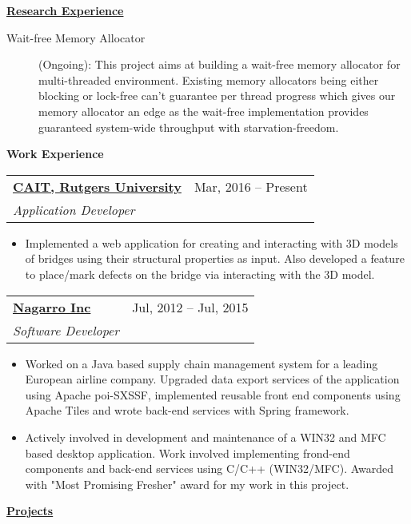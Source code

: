 \documentclass[letterpaper,11pt]{article}
\makeatletter
\newcommand{\resitem}[1]{\item #1 \vspace{2pt}}
\newcommand{\resheading}[1]{{\large \colorbox{mygrey}{\begin{minipage}{\textwidth}{\textbf{#1 \vphantom{p\^{E}}}}\end{minipage}}}\vspace{6pt}}
\newcommand{\ressubheading}[4]{
\begin{tabular*}{7in}{l@{\extracolsep{\fill}}r}
		\textbf{#1} & #2 \\
		\textit{#3} & \textit{#4} \\
\end{tabular*}\vspace{-3pt}}
\makeatother
\begin{document}
\resheading{\href{https://github.com/ashish-17/}{Research Experience}}
\begin{description}
\item[Wait-free Memory Allocator]{\footnotesize(Ongoing): This project aims at building a wait-free memory allocator for multi-threaded environment. Existing memory allocators being either blocking or lock-free can't guarantee per thread progress which gives our memory allocator an edge as the wait-free implementation provides guaranteed system-wide throughput with starvation-freedom.}

\end{description}
\resheading{Work Experience}
\ressubheading{\href{https://cait.rutgers.edu/}{CAIT, Rutgers University}}{Mar, 2016 -- Present}
				{Application Developer}{}
				{ \footnotesize
				\begin{itemize}
					\resitem{Implemented a web application for creating and interacting with 3D models of bridges using their structural properties as input. Also developed a feature to place/mark defects on the bridge via interacting with the 3D model.}
							\end{itemize}
				}			
			\ressubheading{\href{http://www.nagarro.com/}{Nagarro Inc}}{Jul, 2012 -- Jul, 2015}
				{Software Developer}{}
				{ \footnotesize
				\begin{itemize}
					\resitem{Worked on a Java based supply chain management system for a leading European airline company. Upgraded data export services  of the application using Apache poi-SXSSF, implemented reusable front end components using Apache Tiles and wrote back-end services with Spring framework.}
					\resitem{Actively involved in development and maintenance of a WIN32 and MFC based desktop application. Work involved implementing frond-end components and back-end services using C/C++ (WIN32/MFC). Awarded with "Most Promising Fresher" award for my work in this project.}
							\end{itemize}
				}			


\resheading{\href{http://www.ashish-jindal.com/}{Projects}}
\end{document}
